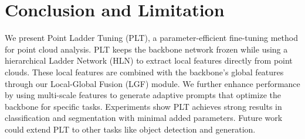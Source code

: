 \section{Conclusion and Limitation}
\label{sec:conclusion&limitation}

We present Point Ladder Tuning (PLT), a parameter-efficient fine-tuning method for point cloud analysis. PLT keeps the backbone network frozen while using a hierarchical Ladder Network (HLN) to extract local features directly from point clouds. These local features are combined with the backbone's global features through our Local-Global Fusion (LGF) module. We further enhance performance by using multi-scale features to generate adaptive prompts that optimize the backbone for specific tasks. Experiments show PLT achieves strong results in classification and segmentation with minimal added parameters. Future work could extend PLT to other tasks like object detection and generation.

